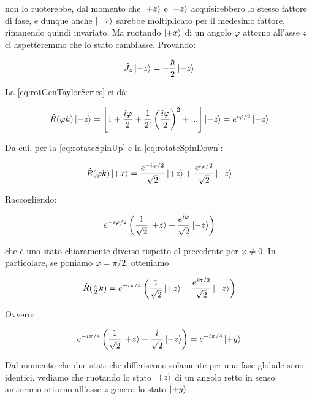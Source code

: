 non lo ruoterebbe, dal momento che $\ket{+z}$ e $\ket{-z}$ acquisirebbero lo stesso fattore di fase, e dunque anche $\ket{+x}$ sarebbe moltiplicato per il medesimo fattore, rimanendo quindi invariato. Ma ruotando $\ket{+x}$ di un angolo $\varphi$ attorno all'asse $z$ ci aspetteremmo che lo stato cambiasse. Provando:

	\begin{equation}
		\hat{J}_z \ket{-z} = - \frac{\hbar}{2} \ket{-z}	
	\end{equation}

La \eqref{eq:rotGenTaylorSeries} ci d\`a:

	\begin{equation} \label{eq:rotateSpinDown}
		\hat{R}(\varphi k) \ket{-z} = \left [ 1 + \frac{i \varphi}{2} + \frac{1}{2!} \left( \frac{i \varphi}{2} \right )^2 + ... \right ] \ket{-z} = e^{i \varphi / 2} \ket {-z}
	\end{equation}

Da cui, per la \eqref{eq:rotateSpinUp} e la \eqref{eq:rotateSpinDown}:

	\begin{equation}
		\hat{R}(\varphi k) \ket{+x} = \frac{e^{-i \varphi / 2}}{\sqrt{2}} \ket{+z} + \frac{e^{i \varphi / 2}}{\sqrt{2}} \ket{-z}
	\end{equation}

Raccogliendo:

	\begin{equation}
		e^{-i \varphi / 2} \left ( \frac{1}{\sqrt{2}} \ket{+z} + \frac{e^{i \varphi}}{\sqrt{2}} \ket{-z} \right )
	\end{equation}

che \`e uno stato chiaramente diverso rispetto al precedente per $\varphi \neq 0$. In particolare, se poniamo $\varphi = \pi / 2$, otteniamo

	\begin{equation}
		\hat{R}(\tfrac{\pi}{2} k) = e^{-i \pi / 4} \left ( \frac{1}{\sqrt{2}} \ket{+z} + \frac{e^{i \pi / 2}}{\sqrt{2}} \ket{-z} \right )	
	\end{equation}

Ovvero:

	\begin{equation}
		e^{-i \pi / 4} \left( \frac{1}{\sqrt{2}} \ket{+z} + \frac{i}{\sqrt{2}} \ket{-z} \right ) = e^{-i \pi / 4} \ket{+y}
	\end{equation}

Dal momento che due stati che differiscono solamente per una fase globale sono identici, vediamo che ruotando lo stato $\ket{+z}$ di un angolo retto in senso antiorario attorno all'asse $z$ genera lo stato $\ket{+y}$.

